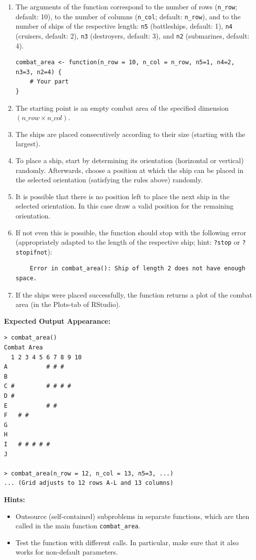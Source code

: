 \documentclass[a4paper,11pt]{article}
\begin{document}
\begin{enumerate}
    \item The arguments of the function correspond to the number of rows (\texttt{n\_row}; default: 10), to the number of columns (\texttt{n\_col}; default: \texttt{n\_row}), and to the number of ships of the respective length: \texttt{n5} (battleships, default: 1), \texttt{n4} (cruisers, default: 2), \texttt{n3} (destroyers, default: 3), and \texttt{n2} (submarines, default: 4).
    
\begin{lstlisting}
combat_area <- function(n_row = 10, n_col = n_row, n5=1, n4=2, n3=3, n2=4) {
    # Your part
}
\end{lstlisting}

    \item The starting point is an empty combat area of the specified dimension $(n\_row \times n\_col)$.
    \item The ships are placed consecutively according to their size (starting with the largest).
    \item To place a ship, start by determining its orientation (horizontal or vertical) randomly. Afterwards, choose a position at which the ship can be placed in the selected orientation (satisfying the rules above) randomly.
    \item It is possible that there is no position left to place the next ship in the selected orientation. In this case draw a valid position for the remaining orientation.
    \item If not even this is possible, the function should stop with the following error (appropriately adapted to the length of the respective ship; hint: \texttt{?stop} or \texttt{?stopifnot}):
    \begin{verbatim}
    Error in combat_area(): Ship of length 2 does not have enough space.
    \end{verbatim}
    \item If the ships were placed successfully, the function returns a plot of the combat area (in the Plots-tab of RStudio).
\end{enumerate}

\noindent \textbf{Expected Output Appearance:}

\begin{verbatim}
> combat_area()
Combat Area
  1 2 3 4 5 6 7 8 9 10
A           # # #
B
C #         # # # #
D #
E           # #
F   # #
G
H
I   # # # # #
J

> combat_area(n_row = 12, n_col = 13, n5=3, ...)
... (Grid adjusts to 12 rows A-L and 13 columns)
\end{verbatim}

\noindent \textbf{Hints:}
\begin{itemize}
    \item Outsource (self-contained) subproblems in separate functions, which are then called in the main function \texttt{combat\_area}.
    \item Test the function with different calls. In particular, make sure that it also works for non-default parameters.
\end{itemize}
\end{document}
